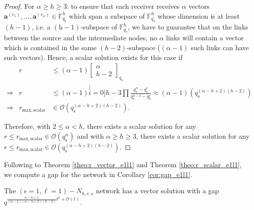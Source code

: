 \begin{proof}
For $\alpha\geq h\geq3$: to ensure that each receiver receives $\alpha$
vectors $\boldsymbol{a}^{\left(r_{1}\right)},\ldots,\boldsymbol{a}^{\left(r_{\alpha}\right)}\in\ensuremath{\mathbb{F}}_{q_{\mathrm{s}}}^{h}$
which span a subspace of $\ensuremath{\mathbb{F}}_{q_{\mathrm{s}}}^{h}$
whose dimension is at least $\left(h-1\right)$, i.e. a $\mathrm{(h-1)}$-subspace
of $\ensuremath{\mathbb{F}}_{q_{\mathrm{s}}}^{h}$, we have to guarantee
that on the links between the source and the intermediate nodes, no
$\alpha$ links will contain a vector which is contained in the same
$(h-2)$-subspace ($\left(\alpha-1\right)$ such links can have such
vectors). Hence, a scalar solution exists for this case if
\begin{eqnarray*}
 & r & \leq\left(\alpha-1\right)\left[\begin{array}{c}
\alpha\\
h-2
\end{array}\right]_{q_{\mathrm{s}}}\\
\Rightarrow & r & \leq\left(\alpha-1\right)\stackrel[i=0]{h-3}{\prod}\frac{q_{\mathrm{s}}^{\alpha}-q_{\mathrm{s}}^{i}}{q_{\mathrm{s}}^{h-2}-q_{\mathrm{s}}^{i}}\approx\left(\alpha-1\right)\left(q_{\mathrm{s}}^{\left(\alpha-h+2\right)\left(h-2\right)}\right)\\
\Rightarrow & r_{\mathrm{max,scalar}} & \in\mathcal{O}\left(q_{\mathrm{s}}^{\left(\alpha-h+2\right)\left(h-2\right)}\right).
\end{eqnarray*}

Therefore, with $2\leq\alpha<h$, there exists a scalar solution for
any $r\leq r_{\mathrm{max,scalar}}\in\mathcal{O}\left(q_{\mathrm{s}}^{\alpha}\right)$
and with $\alpha\geq h\geq3$, there exists a scalar solution for
any $r\leq r_{\mathrm{max,scalar}}\in\mathcal{O}\left(q_{\mathrm{s}}^{\left(\alpha-h+2\right)\left(h-2\right)}\right)$.
\end{proof}
Following to Theorem \ref{theo:r_vector_e1l1} and Theorem \ref{theo:r_scalar_e1l1},
we compute a gap for the network in Corollary \ref{cor:gap_e1l1}.
\begin{cor}
The $\left(\epsilon=1,\ell=1\right)-\ensuremath{N}_{h,r,s}$ network
has a vector solution with a gap $q^{\frac{\alpha-h+1}{\left(\alpha-1\right)\left(\alpha-h+2\right)\left(h-2\right)}t^{2}+\mathcal{O}(t)}$.
\label{cor:gap_e1l1}
\end{cor}
